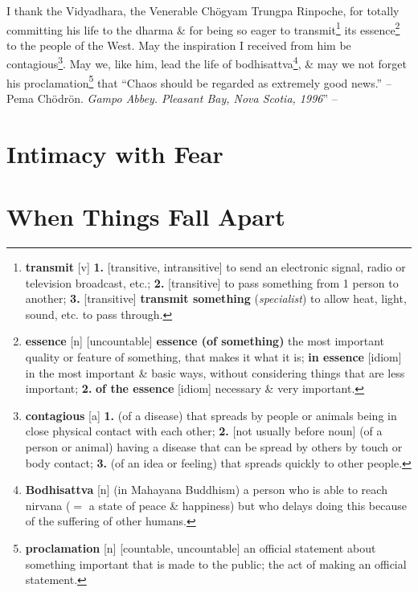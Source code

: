 \documentclass[oneside]{book}
\numberwithin{equation}{section}
\begin{document}
I thank the Vidyadhara, the Venerable Ch\"ogyam Trungpa Rinpoche, for totally committing his life to the dharma \& for being so eager to transmit\footnote{\textbf{transmit} [v] \textbf{1.} [transitive, intransitive] to send an electronic signal, radio or television broadcast, etc.; \textbf{2.} [transitive] to pass something from 1 person to another; \textbf{3.} [transitive] \textbf{transmit something} (\textit{specialist}) to allow heat, light, sound, etc. to pass through.} its essence\footnote{\textbf{essence} [n] [uncountable] \textbf{essence (of something)} the most important quality or feature of something, that makes it what it is; \textbf{in essence} [idiom] in the most important \& basic ways, without considering things that are less important; \textbf{2.} \textbf{of the essence} [idiom] necessary \& very important.} to the people of the West. May the inspiration I received from him be contagious\footnote{\textbf{contagious} [a] \textbf{1.} (of a disease) that spreads by people or animals being in close physical contact with each other; \textbf{2.} [not usually before noun] (of a person or animal) having a disease that can be spread by others by touch or body contact; \textbf{3.} (of an idea or feeling) that spreads quickly to other people.}. May we, like him, lead the life of bodhisattva\footnote{\textbf{Bodhisattva} [n] (in Mahayana Buddhism) a person who is able to reach nirvana ($=$ a state of peace \& happiness) but who delays doing this because of the suffering of other humans.}, \& may we not forget his proclamation\footnote{\textbf{proclamation} [n] [countable, uncountable] an official statement about something important that is made to the public; the act of making an official statement.} that ``Chaos should be regarded as extremely good news.'' -- Pema Ch\"odr\"on. \textit{Gampo Abbey. Pleasant Bay, Nova Scotia, 1996}'' -- \cite[pp. xi--xiv]{Chodron2002}


\section{Intimacy with Fear}
\begin{quotation}
\end{quotation}


\section{When Things Fall Apart}
\end{document}
